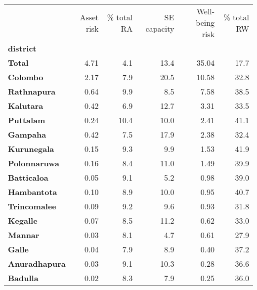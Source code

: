 \begin{tabular}{lrrrrr}
\toprule
{} &  Asset risk &  \% total RA &  SE capacity &  Well-being risk &  \% total RW \\
\textbf{district    } &             &             &              &                  &             \\
\midrule
\textbf{Total       } &        4.71 &         4.1 &         13.4 &            35.04 &        17.7 \\
\textbf{Colombo     } &        2.17 &         7.9 &         20.5 &            10.58 &        32.8 \\
\textbf{Rathnapura  } &        0.64 &         9.9 &          8.5 &             7.58 &        38.5 \\
\textbf{Kalutara    } &        0.42 &         6.9 &         12.7 &             3.31 &        33.5 \\
\textbf{Puttalam    } &        0.24 &        10.4 &         10.0 &             2.41 &        41.1 \\
\textbf{Gampaha     } &        0.42 &         7.5 &         17.9 &             2.38 &        32.4 \\
\textbf{Kurunegala  } &        0.15 &         9.3 &          9.9 &             1.53 &        41.9 \\
\textbf{Polonnaruwa } &        0.16 &         8.4 &         11.0 &             1.49 &        39.9 \\
\textbf{Batticaloa  } &        0.05 &         9.1 &          5.2 &             0.98 &        39.0 \\
\textbf{Hambantota  } &        0.10 &         8.9 &         10.0 &             0.95 &        40.7 \\
\textbf{Trincomalee } &        0.09 &         9.2 &          9.6 &             0.93 &        31.8 \\
\textbf{Kegalle     } &        0.07 &         8.5 &         11.2 &             0.62 &        33.0 \\
\textbf{Mannar      } &        0.03 &         8.1 &          4.7 &             0.61 &        27.9 \\
\textbf{Galle       } &        0.04 &         7.9 &          8.9 &             0.40 &        37.2 \\
\textbf{Anuradhapura} &        0.03 &         9.1 &         10.3 &             0.28 &        36.6 \\
\textbf{Badulla     } &        0.02 &         8.3 &          7.9 &             0.25 &        36.0 \\

\end{tabular}
